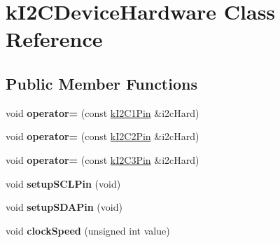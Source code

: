 \hypertarget{classkI2CDeviceHardware}{}\section{k\+I2\+C\+Device\+Hardware Class Reference}
\label{classkI2CDeviceHardware}
\subsection*{Public Member Functions}
\begin{DoxyCompactItemize}
\item 
void {\bfseries operator=} (const \hyperlink{structkI2C1Pin}{k\+I2\+C1\+Pin} \&i2c\+Hard)\hypertarget{classkI2CDeviceHardware_a679af91213606c5b4578ff339de3ee6f}{}\label{classkI2CDeviceHardware_a679af91213606c5b4578ff339de3ee6f}

\item 
void {\bfseries operator=} (const \hyperlink{structkI2C2Pin}{k\+I2\+C2\+Pin} \&i2c\+Hard)\hypertarget{classkI2CDeviceHardware_a080dcae96ac9be37809fcd68d32cc78e}{}\label{classkI2CDeviceHardware_a080dcae96ac9be37809fcd68d32cc78e}

\item 
void {\bfseries operator=} (const \hyperlink{structkI2C3Pin}{k\+I2\+C3\+Pin} \&i2c\+Hard)\hypertarget{classkI2CDeviceHardware_a391bdcaf62518e322c207ae755255a01}{}\label{classkI2CDeviceHardware_a391bdcaf62518e322c207ae755255a01}

\item 
void {\bfseries setup\+S\+C\+L\+Pin} (void)\hypertarget{classkI2CDeviceHardware_acd2d326416a95b0f1bfacef5a060bce8}{}\label{classkI2CDeviceHardware_acd2d326416a95b0f1bfacef5a060bce8}

\item 
void {\bfseries setup\+S\+D\+A\+Pin} (void)\hypertarget{classkI2CDeviceHardware_a9659890e2121651836f69c3923ac7ea4}{}\label{classkI2CDeviceHardware_a9659890e2121651836f69c3923ac7ea4}

\item 
void {\bfseries clock\+Speed} (unsigned int value)\hypertarget{classkI2CDeviceHardware_ad34d314130ee0d6b9181963913f5f367}{}\label{classkI2CDeviceHardware_ad34d314130ee0d6b9181963913f5f367}

\end{DoxyCompactItemize}
